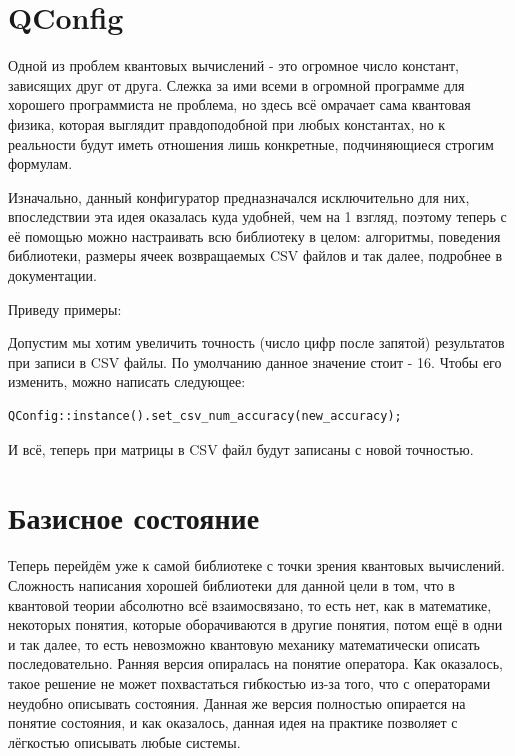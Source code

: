 \documentclass[12pt,fleqn]{article}
\begin{document}
        \section{QConfig}
        Одной из проблем квантовых вычислений - это огромное число констант, зависящих друг от друга. Слежка за ими всеми в огромной программе для хорошего программиста не проблема,
         но здесь всё омрачает сама квантовая физика, которая выглядит правдоподобной при любых константах, но к реальности будут иметь отношения лишь конкретные, подчиняющиеся строгим формулам.

         Изначально, данный конфигуратор предназначался исключительно для них, впоследствии эта идея оказалась куда удобней, чем на 1 взгляд, поэтому теперь с её помощью можно настраивать всю 
         библиотеку в целом: алгоритмы, поведения библиотеки, размеры ячеек возвращаемых CSV файлов и так далее, подробнее в документации.

        Приведу примеры:

        Допустим мы хотим увеличить точность (число цифр после запятой) результатов при записи в CSV файлы. По умолчанию данное значение стоит - 16. Чтобы его изменить, можно написать следующее:

\begin{mdframed}[linecolor=black, topline=true, bottomline=true,
    leftline=false, rightline=false]
\begin{verbatim}
QConfig::instance().set_csv_num_accuracy(new_accuracy);
\end{verbatim}
\end{mdframed}

        И всё, теперь при матрицы в CSV файл будут записаны с новой точностью.

        \section{Базисное состояние}
        
        Теперь перейдём уже к самой библиотеке с точки зрения квантовых вычислений. Сложность написания хорошей библиотеки для данной цели в том, что в квантовой теории абсолютно всё 
        взаимосвязано, то есть нет, как в математике, некоторых понятия, которые оборачиваются в другие понятия, потом ещё в одни и так далее, то есть невозможно квантовую механику математически 
        описать последовательно.
        Ранняя версия опиралась на понятие оператора. Как оказалось, такое решение не может похвастаться гибкостью из-за того, 
        что с операторами неудобно описывать состояния. Данная же версия полностью опирается на понятие состояния, и как оказалось,
        данная идея на практике позволяет с лёгкостью описывать любые системы.
\end{document}
